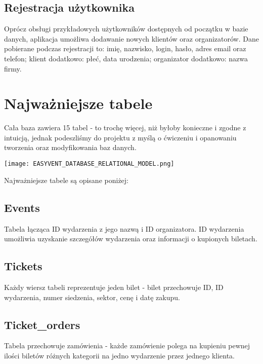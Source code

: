 \documentclass[12pt]{article}
\begin{document}
    \subsection{Rejestracja użytkownika}
    
        Oprócz obsługi przykładowych użytkowników dostępnych od początku w bazie danych, aplikacja umożliwa dodawanie nowych klientów oraz organizatorów. Dane pobierane podczas rejestracji to: imię, nazwisko, login, hasło, adres email oraz telefon; klient dodatkowo: płeć, data urodzenia; organizator dodatkowo: nazwa firmy.
        
\section{Najważniejsze tabele}

    Cała baza zawiera 15 tabel - to trochę więcej, niż byłoby konieczne i zgodne z intuicją, jednak podeszliśmy do projektu z myślą o ćwiczeniu i opanowaniu tworzenia oraz modyfikowania baz danych. 

        \begin{center}
        \texttt{[image: EASYVENT\_DATABASE\_RELATIONAL\_MODEL.png]}
        \end{center}

    Najważniejsze tabele są opisane poniżej:
    
    \subsection{Events}
        
        Tabela łącząca ID wydarzenia z jego nazwą i ID organizatora. ID wydarzenia umożliwia uzyskanie szczegółów wydarzenia oraz informacji o kupionych biletach.
    
    \subsection{Tickets}
    
        Każdy wiersz tabeli reprezentuje jeden bilet - bilet przechowuje ID, ID wydarzenia, numer siedzenia, sektor, cenę i datę zakupu.
        
    \subsection{Ticket\_orders}
    
        Tabela przechowuje zamówienia - każde zamówienie polega na kupieniu pewnej ilości biletów różnych kategorii na jedno wydarzenie przez jednego klienta.
        
\end{document}
